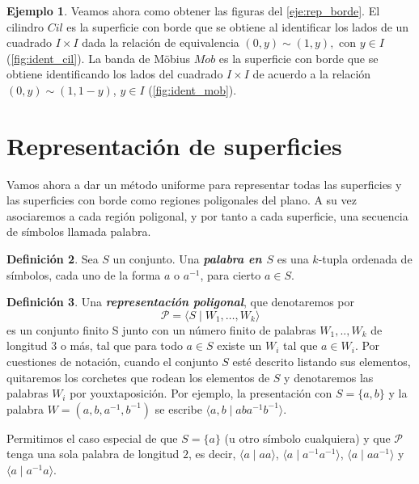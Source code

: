 \documentclass[10pt]{report}
\theoremstyle{definition}
\newtheorem{defin}{Definición}[section]
\newtheorem{eje}[defin]{Ejemplo}
\begin{document}
\begin{eje}\label{eje:rep_mobius}
Veamos ahora como obtener las figuras del \autoref{eje:rep_borde}. El cilindro $Cil$ es la superficie con borde que se obtiene al identificar los lados de un cuadrado $I\times I$ dada la relación de equivalencia $(0,y)\sim (1,y),$ con $y\in I$ (\autoref{fig:ident_cil}). La banda de Möbius $Mob$ es la superficie con borde que se obtiene identificando los lados del cuadrado $I\times I$ de acuerdo a la relación $(0,y)\sim (1,1-y)$, $y\in I$ (\autoref{fig:ident_mob}).
\end{eje}

\section{Representación de superficies}
Vamos ahora a dar un método uniforme para representar todas las superficies y las superficies con borde como regiones poligonales del plano. A su vez asociaremos a cada región poligonal, y por tanto a cada superficie, una secuencia de símbolos llamada palabra. 


\begin{defin}%
Sea $S$ un conjunto. Una \textbf{\textit{palabra en $S$}} es una $k$-tupla ordenada de símbolos, cada uno de la forma $a$ o $a^{-1}$, para cierto $a\in S$.
\end{defin}

\begin{defin}%
\label{def:rep_pol}
Una \textbf{\textit{representación poligonal}}, que denotaremos por $$\mathcal{P}=\langle S\mid W_1,\dots ,W_k\rangle$$ es un conjunto finito S junto con un número finito de palabras $W_1,..,W_k$ de longitud $3$ o más, tal que para todo $a\in S$ existe un $W_i$ tal que $a\in W_i$. Por cuestiones de notación, cuando el conjunto $S$ esté descrito listando sus elementos, quitaremos los corchetes que rodean los elementos de $S$ y denotaremos las palabras $W_i$ por youxtaposición. Por ejemplo, la presentación con $S=\{a,b\}$ y la palabra $W=(a,b,a^{-1},b^{-1})$ se escribe $\langle a,b\mid  aba^{-1}b^{-1}\rangle$. 

Permitimos el caso especial de que $S=\{a\}$ (u otro símbolo cualquiera) y que $\mathcal{P}$ tenga una sola palabra de longitud $2$, es decir, $\langle a\mid aa\rangle$, $\langle a\mid a^{-1}a^{-1}\rangle$, $\langle a\mid aa^{-1}\rangle$ y $\langle a\mid a^{-1}a\rangle$.

\end{defin}
\end{document}
